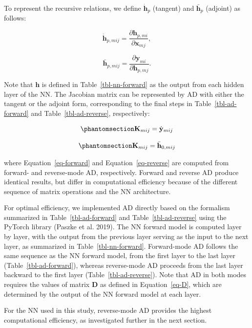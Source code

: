 \documentclass[
  11pt,
  letterpaper,
  DIV=11,
  numbers=noendperiod]{scrreprt}
\begin{document}
To represent the recursive relations, we define \(\dot{\mathbf{h}}_p\)
(tangent) and \(\bar{\mathbf{h}}_p\) (adjoint) as follows:

\[
\dot{\mathbf{h}}_{p,mij}
=
\frac{\partial \mathbf{h}_{p,mi}}
{\partial \mathbf{x}_{mj}},
\]

\[
\bar{\mathbf{h}}_{p,mij}
=
\frac{\partial \mathbf{y}_{mi}}
{\partial \mathbf{h}_{p,mj}}.
\]

Note that \(\mathbf{h}\) is defined in Table~\ref{tbl-nn-forward} as the
output from each hidden layer of the NN. The Jacobian matrix can be
represented by AD with either the tangent or the adjoint form,
corresponding to the final steps in Table~\ref{tbl-ad-forward} and
Table~\ref{tbl-ad-reverse}, respectively:

\begin{equation}\phantomsection\label{eq-forward}{
\mathbf{K}_{mij}
=
\dot{\mathbf{y}}_{mij}
}\end{equation}

\begin{equation}\phantomsection\label{eq-reverse}{
\mathbf{K}_{mij}
=
\bar{\mathbf{h}}_{0,mij}
}\end{equation}

where Equation~\ref{eq-forward} and Equation~\ref{eq-reverse} are
computed from forward- and reverse-mode AD, respectively. Forward and
reverse AD produce identical results, but differ in computational
efficiency because of the different sequence of matrix operations and
the NN architecture.

For optimal efficiency, we implemented AD directly based on the
formalism summarized in Table~\ref{tbl-ad-forward} and
Table~\ref{tbl-ad-reverse} using the PyTorch library (Paszke et al.
2019). The NN forward model is computed layer by layer, with the output
from the previous layer serving as the input to the next layer, as
summarized in Table~\ref{tbl-nn-forward}. Forward-mode AD follows the
same sequence as the NN forward model, from the first layer to the last
layer (Table~\ref{tbl-ad-forward}), whereas reverse-mode AD proceeds
from the last layer backward to the first layer
(Table~\ref{tbl-ad-reverse}). Note that AD in both modes requires the
values of matrix \(\mathbf{D}\) as defined in Equation~\ref{eq-D}, which
are determined by the output of the NN forward model at each layer.

For the NN used in this study, reverse-mode AD provides the highest
computational efficiency, as investigated further in the next section.
\end{document}
